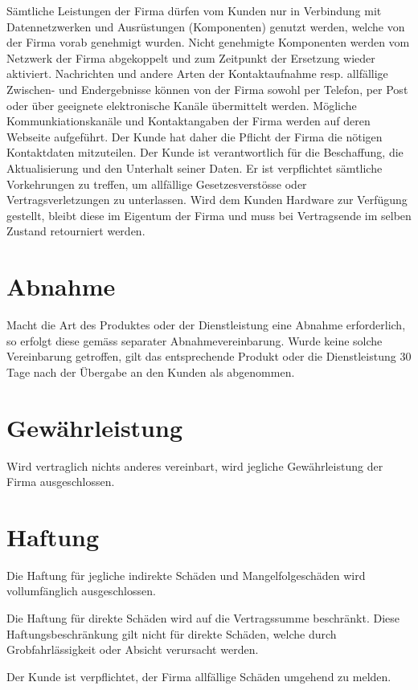 \documentclass[twocolumn, 10pt]{article}
\begin{document}
Sämtliche Leistungen der Firma dürfen vom Kunden nur in Verbindung mit Datennetzwerken und Ausrüstungen (Komponenten) genutzt werden, welche von der Firma vorab genehmigt wurden. Nicht genehmigte Komponenten werden vom Netzwerk der Firma abgekoppelt und zum Zeitpunkt der Ersetzung wieder aktiviert.
Nachrichten und andere Arten der Kontaktaufnahme resp. allfällige Zwischen- und Endergebnisse können von der Firma sowohl per Telefon, per Post oder über geeignete elektronische Kanäle übermittelt werden. Mögliche Kommunkiationskanäle und Kontaktangaben der Firma werden auf deren Webseite aufgeführt.
Der Kunde hat daher die Pflicht der Firma die nötigen Kontaktdaten mitzuteilen. Der Kunde ist verantwortlich für die Beschaffung, die Aktualisierung und den Unterhalt seiner Daten. Er ist verpflichtet sämtliche Vorkehrungen zu treffen, um allfällige Gesetzesverstösse oder Vertragsverletzungen zu unterlassen. Wird dem Kunden Hardware zur Verfügung gestellt, bleibt diese im Eigentum der Firma und muss bei Vertragsende im selben Zustand retourniert werden.

\section{Abnahme}
Macht die Art des Produktes oder der Dienstleistung eine Abnahme erforderlich, so erfolgt diese gemäss separater Abnahmevereinbarung. Wurde keine solche Vereinbarung getroffen, gilt das entsprechende Produkt oder die Dienstleistung 30 Tage nach der Übergabe an den Kunden als abgenommen.

\section{Gewährleistung}
Wird vertraglich nichts anderes vereinbart, wird jegliche Gewährleistung der Firma ausgeschlossen.

\section{Haftung}
Die Haftung für jegliche indirekte Schäden und Mangelfolgeschäden wird vollumfänglich ausgeschlossen.

Die Haftung für direkte Schäden wird auf die Vertragssumme beschränkt. Diese Haftungsbeschränkung gilt nicht für direkte Schäden, welche durch Grobfahrlässigkeit oder Absicht verursacht werden.

Der Kunde ist verpflichtet, der Firma allfällige Schäden umgehend zu melden.
\end{document}
